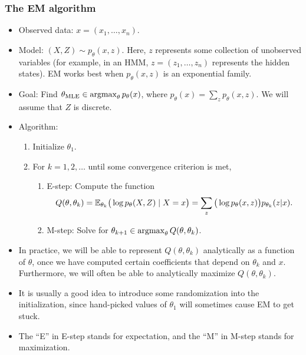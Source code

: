 \documentclass[12pt]{article}
\begin{document}
\subsubsection{The EM algorithm}
\begin{itemize}
\item Observed data: $x = (x_1,\ldots,x_n)$.
\item Model: $(X,Z) \sim p_\theta(x,z)$. Here, $z$ represents some collection of unobserved variables (for example, in an HMM, $z = (z_1,\ldots,z_n)$ represents the hidden states). EM works best when $p_\theta(x,z)$ is an exponential family.
\item Goal: Find $\theta_\text{MLE} \in \operatorname*{argmax}_\theta p_\theta(x)$, where $p_\theta(x) = \sum_z p_\theta(x,z)$. We will assume that $Z$ is discrete.
\item Algorithm:
\begin{enumerate}
\item Initialize $\theta_1$.
\item For $k = 1,2,\ldots$ until some convergence criterion is met,
\begin{enumerate}
\item E-step: Compute the function
$$Q(\theta,\theta_k) = \mathbb{E}_{\theta_k} \big(\log p_\theta(X,Z) \mid X = x \big) = \sum_z \big( \log p_\theta(x,z) \big) p_{\theta_k}(z | x).$$
\item M-step: Solve for $\theta_{k +1} \in \operatorname*{argmax}_\theta Q(\theta,\theta_k)$.
\end{enumerate}
\end{enumerate}
\item In practice, we will be able to represent $Q(\theta,\theta_k)$ analytically as a function of $\theta$, once we have computed certain coefficients that depend on $\theta_k$ and $x$. Furthermore, we will often be able to analytically maximize $Q(\theta,\theta_k)$.
\item It is usually a good idea to introduce some randomization into the initialization, since hand-picked values of $\theta_1$ will sometimes cause EM to get stuck.
\item The ``E'' in E-step stands for expectation, and the ``M'' in M-step stands for maximization.
\end{itemize}
\end{document}
